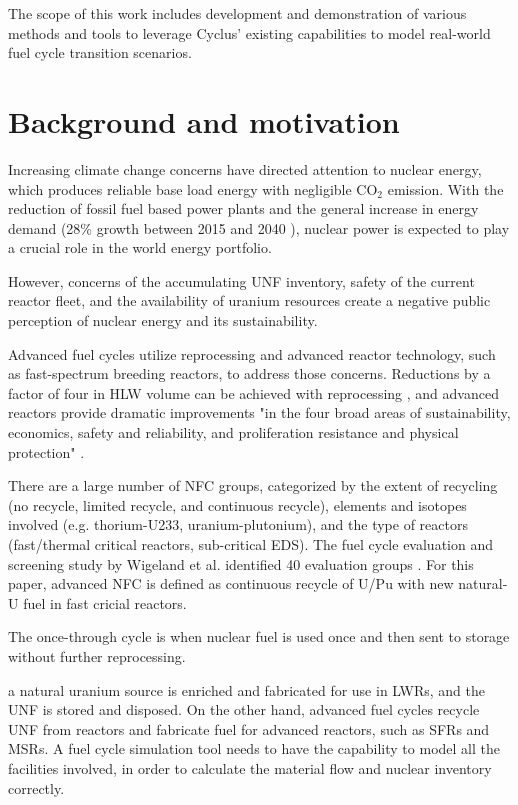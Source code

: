 The scope of this work includes development and demonstration of
various methods and tools to leverage Cyclus' existing
capabilities to model real-world fuel cycle transition scenarios.

\section{Background and motivation}
Increasing climate change concerns have directed attention
to nuclear energy, which produces reliable base load energy
with negligible CO$_2$ emission. With the reduction of fossil
fuel based power plants and the general increase in energy demand
(28\% growth between 2015 and 2040 \cite{conti_international_2016}),
nuclear power is expected to play a crucial role in the world energy portfolio.

However, concerns of the accumulating \gls{UNF} inventory,
safety of the current reactor fleet, and the availability of
uranium resources create a negative public perception of
nuclear energy and its sustainability.

Advanced fuel cycles utilize reprocessing
and advanced reactor technology, such as fast-spectrum breeding reactors,
to address those concerns. Reductions by a factor of four
in \gls{HLW} volume can be achieved with reprocessing \cite{widder_benefits_2010},
and advanced reactors provide dramatic improvements "in the four
broad areas of sustainability, economics, safety and reliability,
and proliferation resistance and physical protection" \cite{committee_technology_2002}.

There are a large number of \gls{NFC} groups, categorized by the extent of recycling
(no recycle, limited recycle, and continuous recycle), elements and isotopes involved
(e.g. thorium-U233, uranium-plutonium), and the type of reactors (fast/thermal critical
reactors, sub-critical \gls{EDS}). The fuel cycle evaluation and screening study by
Wigeland et al. identified 40 evaluation groups \cite{wigeland_nuclear_2014}. For this
paper, advanced \gls{NFC} is defined as continuous recycle of U/Pu with new natural-U
fuel in fast cricial reactors. 

The once-through cycle is when nuclear fuel is used once and then sent to 
storage without further reprocessing. \cite{tsoulfanidis_nuclear_2013}


a natural uranium source is
enriched and fabricated for use in \glspl{LWR}, and the \gls{UNF} is stored and disposed.
On the other hand, advanced fuel cycles recycle \gls{UNF} from reactors and
fabricate fuel for advanced reactors, such as \glspl{SFR} and \glspl{MSR}.
A fuel cycle simulation tool needs
to have the capability to model all the facilities involved, in order to
calculate the material flow and nuclear inventory correctly.

